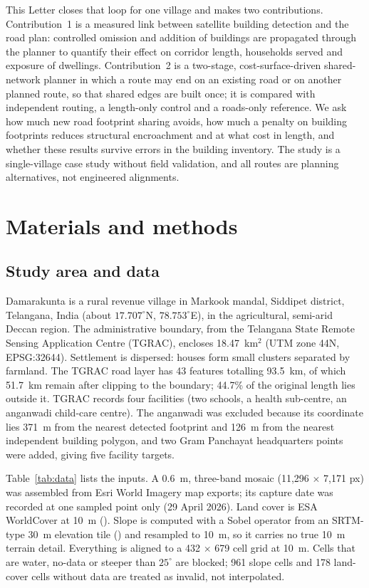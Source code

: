 This Letter closes that loop for one village and makes two contributions. Contribution~1 is a measured link between satellite building detection and the road plan: controlled omission and addition of buildings are propagated through the planner to quantify their effect on corridor length, households served and exposure of dwellings. Contribution~2 is a two-stage, cost-surface-driven shared-network planner in which a route may end on an existing road or on another planned route, so that shared edges are built once; it is compared with independent routing, a length-only control and a roads-only reference. We ask how much new road footprint sharing avoids, how much a penalty on building footprints reduces structural encroachment and at what cost in length, and whether these results survive errors in the building inventory. The study is a single-village case study without field validation, and all routes are planning alternatives, not engineered alignments.

\section{Materials and methods}
\subsection{Study area and data}
Damarakunta is a rural revenue village in Markook mandal, Siddipet district, Telangana, India (about $17.707^{\circ}$N, $78.753^{\circ}$E), in the agricultural, semi-arid Deccan region. The administrative boundary, from the Telangana State Remote Sensing Application Centre (TGRAC), encloses 18.47~km$^2$ (UTM zone 44N, EPSG:32644). Settlement is dispersed: houses form small clusters separated by farmland. The TGRAC road layer has 43 features totalling 93.5~km, of which 51.7~km remain after clipping to the boundary; 44.7\% of the original length lies outside it. TGRAC records four facilities (two schools, a health sub-centre, an anganwadi child-care centre). The anganwadi was excluded because its coordinate lies 371~m from the nearest detected footprint and 126~m from the nearest independent building polygon, and two Gram Panchayat headquarters points were added, giving five facility targets.

Table~\ref{tab:data} lists the inputs. A 0.6~m, three-band mosaic (11{,}296 $\times$ 7{,}171 px) was assembled from Esri World Imagery map exports; its capture date was recorded at one sampled point only (29 April 2026). Land cover is ESA WorldCover at 10~m (\citealt{zanaga2021worldcover}). Slope is computed with a Sobel operator from an SRTM-type 30~m elevation tile (\citealt{farr2007srtm}) and resampled to 10~m, so it carries no true 10~m terrain detail. Everything is aligned to a 432 $\times$ 679 cell grid at 10~m. Cells that are water, no-data or steeper than $25^{\circ}$ are blocked; 961 slope cells and 178 land-cover cells without data are treated as invalid, not interpolated.

